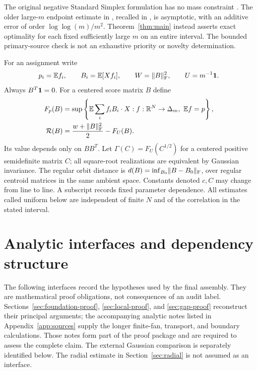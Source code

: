The original negative Standard Simplex formulation has no mass constraint
\cite[Conjecture~1.4]{IM}. The older large-$m$ endpoint estimate in
\cite[Proposition~11.4]{KKMO}, recalled in \cite[equation~(20)]{IM}, is
asymptotic, with an additive error of order $\log\log(m)/m^2$.
Theorem~\ref{thm:main} instead asserts exact optimality for each fixed
sufficiently large $m$ on an entire interval. The bounded primary-source
check \cite{scope} is not an exhaustive priority or novelty determination.

For an assignment write
\begin{equation}\label{eq:assignment-data}
 p_i=\mathbb E f_i,\qquad B_i=\mathbb E[Xf_i],\qquad
 W=\lVert B\rVert_{\mathrm F}^2,\qquad U=m^{-1}\mathbf 1.
\end{equation}
Always $B^T\mathbf 1=0$. For a centered score matrix $B$ define
\begin{align}
 F_p(B)&=\sup\left\{\mathbb E\sum_i f_i B_i\cdot X:
                  f:\mathbb R^N\to\Delta_m,\ \mathbb E f=p\right\},\label{eq:dual-value}\\
 \mathcal R(B)&=\frac{w+\lVert B\rVert_{\mathrm F}^2}{2}-F_U(B).\label{eq:R-def}
\end{align}
Its value depends only on $BB^T$. Let
$\Gamma(C)=F_U(C^{1/2})$ for a centered positive semidefinite matrix
$C$; all square-root realizations are equivalent by Gaussian invariance.
The regular orbit distance is
$d(B)=\inf_{B_0}\lVert B-B_0\rVert_{\mathrm F}$, over regular centroid matrices
in the same ambient space. Constants denoted $c,C$ may change from line
to line. A subscript records fixed parameter dependence. All estimates
called uniform below are independent of finite $N$ and of the correlation
in the stated interval.

\section{Analytic interfaces and dependency structure}\label{sec:inputs}
The following interfaces record the hypotheses used by the final assembly.
They are mathematical proof obligations, not consequences of an audit label.
Sections~\ref{sec:foundation-proof}, \ref{sec:local-proof}, and
\ref{sec:gap-proof} reconstruct their principal arguments; the accompanying
analytic notes listed in Appendix~\ref{app:sources} supply the longer
finite-fan, transport, and boundary calculations. Those notes form part of
the proof package and are required to assess the complete claim. The external
Gaussian comparison is separately identified below. The radial estimate in
Section~\ref{sec:radial} is not assumed as an interface.

